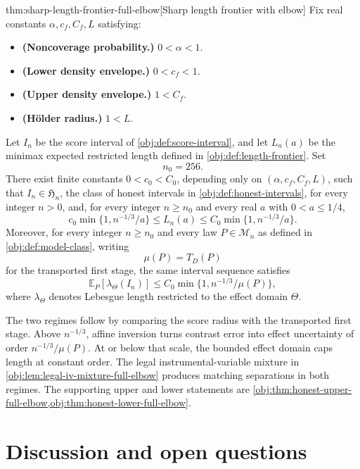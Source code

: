 \documentclass[11pt]{article}
\begin{document}
\begin{theoremv}{thm:sharp-length-frontier-full-elbow}[Sharp length frontier with elbow]
Fix real constants \(\alpha,c_f,C_f,L\) satisfying:
\begin{itemize}
\item \textbf{(Noncoverage probability.)} \(0<\alpha<1\).
\item \textbf{(Lower density envelope.)} \(0<c_f<1\).
\item \textbf{(Upper density envelope.)} \(1<C_f\).
\item \textbf{(Hölder radius.)} \(1<L\).
\end{itemize}
Let \(I_n\) be the score interval of \cref{obj:def:score-interval}, and let \(L_n(a)\) be the minimax expected restricted length defined in \cref{obj:def:length-frontier}. Set
\[
n_0=256.
\]
There exist finite constants \(0<c_0<C_0\), depending only on \((\alpha,c_f,C_f,L)\), such that \(I_n\in\mathfrak H_n\), the class of honest intervals in \cref{obj:def:honest-intervals}, for every integer \(n>0\), and, for every integer \(n\ge n_0\) and every real \(a\) with \(0<a\le 1/4\),
\[
c_0\min\{1,n^{-1/3}/a\}
\le L_n(a)
\le C_0\min\{1,n^{-1/3}/a\}.
\]
Moreover, for every integer \(n\ge n_0\) and every law \(P\in\mathcal M_n\) as defined in \cref{obj:def:model-class}, writing
\[
\mu(P)=T_D(P)
\]
for the transported first stage, the same interval sequence satisfies
\[
\mathbb E_P\!\left[\lambda_{\Theta}(I_n)\right]
\le C_0\min\{1,n^{-1/3}/\mu(P)\},
\]
where \(\lambda_{\Theta}\) denotes Lebesgue length restricted to the effect domain \(\Theta\).
\end{theoremv}

The two regimes follow by comparing the score radius with the transported first stage. Above \(n^{-1/3}\), affine inversion turns contrast error into effect uncertainty of order \(n^{-1/3}/\mu(P)\). At or below that scale, the bounded effect domain caps length at constant order. The legal instrumental-variable mixture in \cref{obj:lem:legal-iv-mixture-full-elbow} produces matching separations in both regimes. The supporting upper and lower statements are \cref{obj:thm:honest-upper-full-elbow,obj:thm:honest-lower-full-elbow}.


\section{Discussion and open questions}
\label{sec:discussion}
\end{document}
